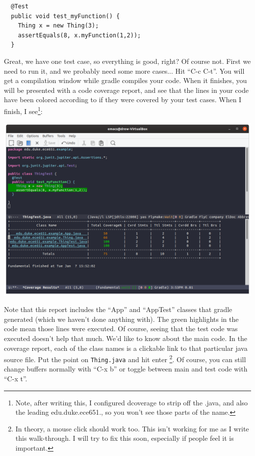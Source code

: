 \documentclass[12pt]{article}
\begin{document}
\begin{verbatim}
  @Test
  public void test_myFunction() {
    Thing x = new Thing(3);
    assertEquals(8, x.myFunction(1,2));
  }
\end{verbatim}

Great, we have one test case, so everything is good, right?  Of course not.
First we need to run it, and we probably need some more cases... Hit
``C-c C-t''.   You will get a compilation window while gradle compiles your
code.  When it finishes, you will be presented with a code coverage
report, and see that the lines in your code have been colored
according to if they were covered by your test cases.
When I finish, I see\footnote{Note, after writing this, I configured
  dcoverage to strip off the .java, and also the leading edu.duke.ece651.,
so you won't see those parts of the name.}:
\begin{center}
  \includegraphics[width=5.5in]{emacs-test-cov1.png}
\end{center}

Note that this report includes the ``App'' and ``AppTest'' classes
that gradle generated (which we haven't done anything with). The
green highlights in the code mean those lines were executed.
Of course, seeing that the test code was executed doesn't help that
much.  We'd like to know about the main code.  In the coverage report,
each of the class names is a clickable link to that particular java
source file.  Put the point on \verb+Thing.java+ and hit enter
\footnote{In theory, a mouse click should work too.  This isn't
  working for me as I write this walk-through.  I will try to fix
this soon, especially if people feel it is important.}.  Of course, you can
still change buffers normally with ``C-x b'' or toggle between main and test
code with ``C-x t''.
\end{document}
